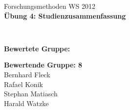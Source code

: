 
\begin{titlepage}
\sffamily

{ \Large Forschungsmethoden WS 2012} \\[2cm]
    
{ \Huge \centering \bfseries Übung 4: Studienzusammenfassung \\[1.5cm] }

{ \LARGE \centering \bfseries \varpressetext \\[1.5cm] }

{
    \begin{flushright}
    { \large
       { \bfseries Bewertete Gruppe:~\vargruppe \\ }
       \varmitglieder
    }

    \end{flushright}
}

\vfill

{ \large
   { \bfseries Bewertende Gruppe: 8 \\ }
   Bernhard Fleck \\
   Rafael Konik \\
   Stephan Matiasch \\
   Harald Watzke \\
}
\end{titlepage}
